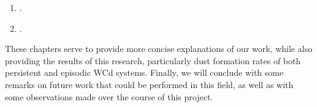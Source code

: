 \begin{enumerate}
  \item \emph{\firstpapertitle} \parencite{eatsonExplorationDustGrain2022}.
  \item \emph{\secondpapertitle} \parencite{eatsonExploringDustGrowth2022}.
\end{enumerate}

\noindent
These chapters serve to provide more concise explanations of our work, while also providing the results of this research, particularly dust formation rates of both persistent and episodic WCd systems.
Finally, we will conclude with some remarks on future work that could be performed in this field, as well as with some observations made over the course of this project.